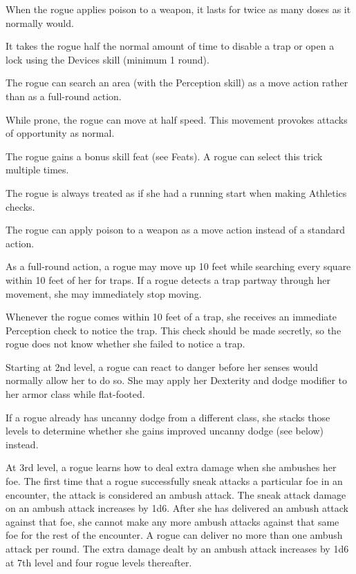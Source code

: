  When the rogue applies poison to a weapon, it lasts for twice as many doses as it normally would.

 It takes the rogue half the normal amount of time to disable a trap or open a lock using the Devices skill (minimum 1 round).

 The rogue can search an area (with the Perception skill) as a move action rather than as a full-round action.

 While prone, the rogue can move at half speed. This movement provokes attacks of opportunity as normal.

 The rogue gains a bonus skill feat (see Feats). A rogue can select this trick multiple times.

 The rogue is always treated as if she had a running start when making Athletics checks.

 The rogue can apply poison to a weapon as a move action instead of a standard action.

 As a full-round action, a rogue may move up 10 feet while searching every square within 10 feet of her for traps. If a rogue detects a trap partway through her movement, she may immediately stop moving.

 Whenever the rogue comes within 10 feet of a trap, she receives an immediate Perception check to notice the trap. This check should be made secretly, so the rogue does not know whether she failed to notice a trap.

 Starting at 2nd level, a rogue can react to danger before her senses would normally allow her to do so. She may apply her Dexterity and dodge modifier to her armor class while flat-footed.

If a rogue already has uncanny dodge from a different class, she stacks those levels to determine whether she gains improved uncanny dodge (see below) instead.

 At 3rd level, a rogue learns how to deal extra damage when she ambushes her foe. The first time that a rogue successfully sneak attacks a particular foe in an encounter, the attack is considered an ambush attack. The sneak attack damage on an ambush attack increases by 1d6. After she has delivered an ambush attack against that foe, she cannot make any more ambush attacks against that same foe for the rest of the encounter. A rogue can deliver no more than one ambush attack per round. The extra damage dealt by an ambush attack increases by 1d6 at 7th level and four rogue levels thereafter.

